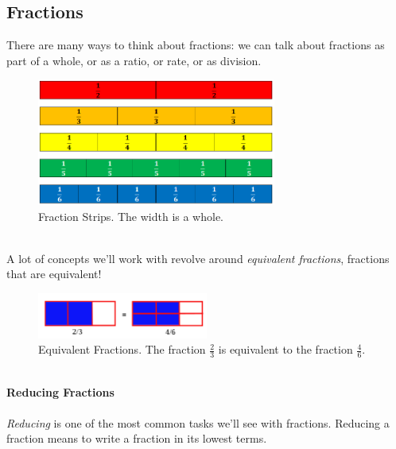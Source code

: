 \subsection{Fractions}
There are many ways to think about fractions: we can talk about fractions as part of a whole, or as a ratio, or rate, or as division.  
\begin{figure}[h!]
    \centering
    \includegraphics[width=0.7\textwidth]{img/FractionStrips.png}  
    \caption{Fraction Strips. The width is a whole.}
    \label{fig:fraction-strips}
\end{figure}
\\
A lot of concepts we'll work with revolve around \emph{equivalent fractions}, fractions that are equivalent!
\begin{figure}[h!]
    \centering
    \includegraphics[width=0.5\textwidth]{img/fraction2-3.png}
    \caption{Equivalent Fractions.  The fraction \(\frac{2}{3}\) is equivalent to the fraction \(\frac{4}{6}\).}
    \label{fig:equivalent-fractions}
\end{figure}
\\ 
\textbf{Reducing Fractions}
\\ \\ 
\emph{Reducing} is one of the most common tasks we'll see with fractions.  Reducing a fraction means to write a fraction in its lowest terms.  




